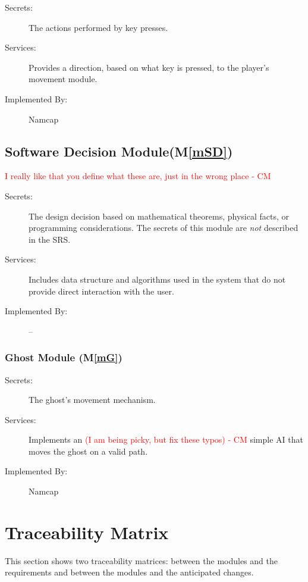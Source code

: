 \documentclass[12pt, titlepage]{article}
\newcommand{\mref}[1]{M\ref{#1}}
\begin{document}
\begin{description}
\item[Secrets:]The actions performed by key presses.
\item[Services:]Provides a direction, based on what key is pressed, to the player's movement module.
\item[Implemented By:] Namcap
\end{description}


\subsection{Software Decision Module(\mref{mSD})}
\textcolor{red}{I really like that you define what these are, just in the wrong place - CM} \\
\begin{description}
\item[Secrets:] The design decision based on mathematical theorems, physical
  facts, or programming considerations. The secrets of this module are
  \emph{not} described in the SRS.
\item[Services:] Includes data structure and algorithms used in the system that
  do not provide direct interaction with the user. 
\item[Implemented By:] --
\end{description}

\subsubsection{Ghost Module (\mref{mG})}

\begin{description}
\item[Secrets:]The ghost's movement mechanism.
\item[Services:]Implements an \textcolor{red}{(I am being picky, but fix these typos) - CM} simple AI that moves the ghost on a valid path.
\item[Implemented By:] Namcap
\end{description}


\section{Traceability Matrix} \label{SecTM}

This section shows two traceability matrices: between the modules and the
requirements and between the modules and the anticipated changes.
\end{document}
